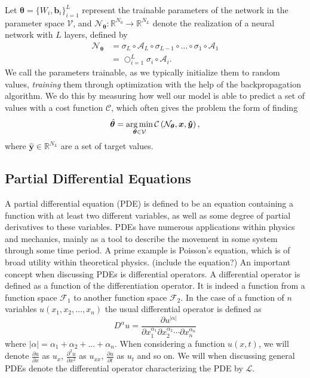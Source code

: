 Let $\boldsymbol{\theta} = \{ W_i, \boldsymbol{b}_i \}_{i = 1}^L$ represent the trainable parameters of the network in the parameter space $\mathcal{V}$, and $\mathcal{N}_{\boldsymbol{\theta}} : \mathbb{R}^{N_0} \to \mathbb{R}^{N_L}$ denote the realization of a neural network with $L$ layers, defined by
\begin{equation}
\begin{split}
    \mathcal{N}_{\boldsymbol{\theta}} &= \sigma_L \circ \mathcal{A}_L \circ \sigma_{L-1} \circ \ldots \circ \sigma_{1} \circ \mathcal{A}_1 \\
    &= \bigcirc_{i = 1}^L \sigma_i \circ \mathcal{A}_i.
\end{split}
\end{equation}
We call the parameters trainable, as we typically initialize them to random values, \textit{training} them through optimization with the help of the backpropagation algorithm. We do this by measuring how well our model is able to predict a set of values with a cost function $\mathcal{C}$, which often gives the problem the form of finding
\begin{equation}\label{eq:argmintheta}
    \hat{\boldsymbol{\theta}} = \operatorname*{arg\,min}_{\boldsymbol{\theta} \in \mathcal{V}} \mathcal{C} \left( \mathcal{N}_{\boldsymbol{\theta}}, \boldsymbol{x}, \boldsymbol{\hat{y}} \right),
\end{equation}
where $\boldsymbol{\hat{y}} \in \mathbb{R}^{N_L}$ are a set of target values.

\subsection{Partial Differential Equations}
A partial differential equation (PDE) is defined to be an equation containing a function with at least two different variables, as well as some degree of partial derivatives to these variables. PDEs have numerous applications within physics and mechanics, mainly as a tool to describe the movement in some system through some time period. A prime example is Poisson’s equation, which is of broad utility within theoretical physics. (include the equation?) \newline
An important concept when discussing PDEs is differential operators. A differential operator is defined as a function of the differentiation operator. It is indeed a function from a function space $\mathcal{F}_1$ to another function space $\mathcal{F}_2$. In the case of a function of $n$ variables $u(x_1, x_2, … , x_n)$ the usual differential operator is defined as 
$$D^\alpha u = \frac{\partial u^{|\alpha|}}{\partial x_1^{\alpha_1} \partial x_2^{\alpha_2} \cdots \partial x_n^{\alpha_n}}$$
where $|\alpha| = \alpha_1 + \alpha_2 + ... + \alpha_n$. When considering a function $u(x,t)$, we will denote $\frac{\partial u}{\partial x}$ as $u_x$, $\frac{\partial^2 u}{\partial x^2}$ as $u_{xx}$, $\frac{\partial u}{\partial t}$ as $u_t$ and so on. We will when discussing general PDEs denote the differential operator characterizing the PDE by $\mathcal{L}$.

